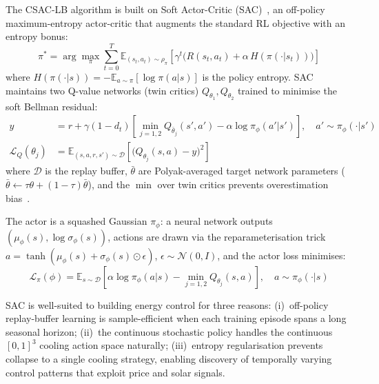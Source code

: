 The CSAC-LB algorithm is built on Soft Actor-Critic
(SAC)~\cite{haarnoja2018sac}, an off-policy maximum-entropy actor-critic that
augments the standard RL objective with an entropy bonus:
\begin{equation}
  \pi^* = \arg\max_\pi \sum_{t=0}^{T}
    \mathbb{E}_{(s_t, a_t) \sim \rho_\pi}\!\left[
      \gamma^t \bigl(R(s_t, a_t) + \alpha\, H(\pi(\cdot|s_t))\bigr)
    \right]
  \label{eq:sac-objective}
\end{equation}
where $H(\pi(\cdot|s)) = -\mathbb{E}_{a \sim \pi}[\log \pi(a|s)]$ is the
policy entropy.  SAC maintains two Q-value networks (twin critics)
$Q_{\theta_1}, Q_{\theta_2}$ trained to minimise the soft Bellman residual:
\begin{align}
  y &= r + \gamma(1 - d_t)\!\left[
    \min_{j=1,2} Q_{\bar{\theta}_j}(s', a')
    - \alpha \log \pi_\phi(a'|s')
  \right], \quad a' \sim \pi_\phi(\cdot|s')
  \label{eq:sac-target} \\
  \mathcal{L}_Q(\theta_j) &= \mathbb{E}_{(s,a,r,s') \sim \mathcal{D}}\!\left[
    \bigl(Q_{\theta_j}(s,a) - y\bigr)^2
  \right]
  \label{eq:sac-critic-loss}
\end{align}
where $\mathcal{D}$ is the replay buffer, $\bar{\theta}$ are Polyak-averaged
target network parameters ($\bar{\theta} \leftarrow \tau\theta + (1-\tau)\bar{\theta}$),
and the $\min$ over twin critics prevents overestimation bias~\cite{fujimoto2018td3}.

The actor is a squashed Gaussian $\pi_\phi$: a neural network outputs
$(\mu_\phi(s), \log\sigma_\phi(s))$, actions are drawn via the
reparameterisation trick $a = \tanh(\mu_\phi(s) + \sigma_\phi(s) \odot \epsilon)$,
$\epsilon \sim \mathcal{N}(0, I)$, and the actor loss minimises:
\begin{equation}
  \mathcal{L}_\pi(\phi) = \mathbb{E}_{s \sim \mathcal{D}}\!\left[
    \alpha \log \pi_\phi(a|s)
    - \min_{j=1,2} Q_{\theta_j}(s, a)
  \right], \quad a \sim \pi_\phi(\cdot|s)
  \label{eq:sac-actor-loss}
\end{equation}

SAC is well-suited to building energy control for three reasons:
(i)~off-policy replay-buffer learning is sample-efficient when each training
episode spans a long seasonal horizon;
(ii)~the continuous stochastic policy handles the continuous $[0,1]^3$ cooling
action space naturally;
(iii)~entropy regularisation prevents collapse to a single cooling strategy,
enabling discovery of temporally varying control patterns that exploit price
and solar signals.


